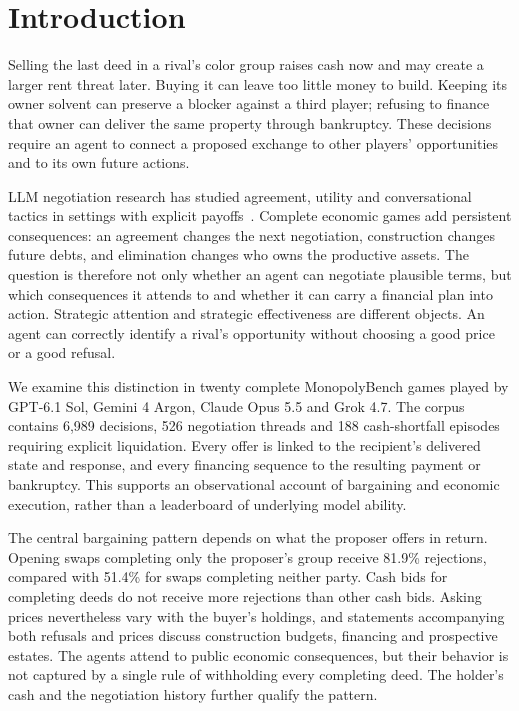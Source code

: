 \section{Introduction}

Selling the last deed in a rival's color group raises cash now and may create a larger rent threat later. Buying it can leave too little money to build. Keeping its owner solvent can preserve a blocker against a third player; refusing to finance that owner can deliver the same property through bankruptcy. These decisions require an agent to connect a proposed exchange to other players' opportunities and to its own future actions.

LLM negotiation research has studied agreement, utility and conversational tactics in settings with explicit payoffs~\cite{lewis2017deal,he2018decoupling,bianchi2024negotiationarena}. Complete economic games add persistent consequences: an agreement changes the next negotiation, construction changes future debts, and elimination changes who owns the productive assets. The question is therefore not only whether an agent can negotiate plausible terms, but which consequences it attends to and whether it can carry a financial plan into action. Strategic attention and strategic effectiveness are different objects. An agent can correctly identify a rival's opportunity without choosing a good price or a good refusal.

We examine this distinction in twenty complete MonopolyBench games played by GPT-6.1 Sol, Gemini 4 Argon, Claude Opus 5.5 and Grok 4.7. The corpus contains 6,989 decisions, 526 negotiation threads and 188 cash-shortfall episodes requiring explicit liquidation. Every offer is linked to the recipient's delivered state and response, and every financing sequence to the resulting payment or bankruptcy. This supports an observational account of bargaining and economic execution, rather than a leaderboard of underlying model ability.

The central bargaining pattern depends on what the proposer offers in return. Opening swaps completing only the proposer's group receive 81.9\% rejections, compared with 51.4\% for swaps completing neither party. Cash bids for completing deeds do not receive more rejections than other cash bids. Asking prices nevertheless vary with the buyer's holdings, and statements accompanying both refusals and prices discuss construction budgets, financing and prospective estates. The agents attend to public economic consequences, but their behavior is not captured by a single rule of withholding every completing deed. The holder's cash and the negotiation history further qualify the pattern.

